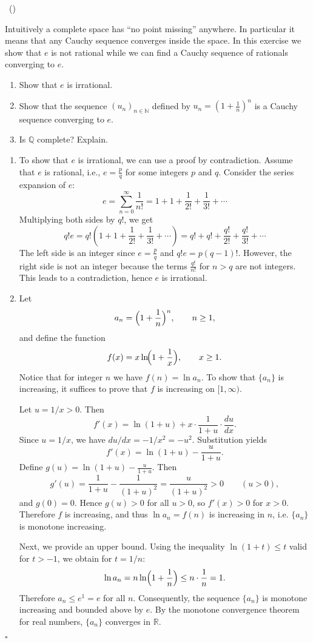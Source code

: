 \documentclass[11pt,a4paper]{article}
\theoremstyle{definition}
\newcounter{problem}
\newenvironment{problem}[1][]{\refstepcounter{problem}\par\medskip
\noindent{\bf Problem~\theproblem.}\ifx\relax#1\relax\else\ (#1)\fi\newline
}{\medskip}
\newenvironment{solution}{\par\noindent{\it Solution.} }{\hfill $\square$ \par}
\begin{document}
\begin{problem}
Intuitively a complete space has “no point missing” anywhere. In particular it means that any Cauchy
sequence converges inside the space. In this exercise we show that $e$ is not rational while we can find a
Cauchy sequence of rationals converging to $e$.
\begin{enumerate}
  \item Show that $e$ is irrational.
  \item Show that the sequence ${(u_n)}_{n \in \mathbb{N}}$ defined by $u_n = {(1 + \frac{1}{n})}^n$ is a Cauchy sequence converging to $e$.
  \item Is $\mathbb{Q}$ complete? Explain.
\end{enumerate}
\begin{solution}
\begin{enumerate}
  \item To show that $e$ is irrational, we can use a proof by contradiction. Assume that $e$ is rational, i.e., $e = \frac{p}{q}$ for some integers $p$ and $q$. Consider the series expansion of $e$:
  \[
  e = \sum_{n=0}^{\infty} \frac{1}{n!} = 1 + 1 + \frac{1}{2!} + \frac{1}{3!} + \cdots
  \]
  Multiplying both sides by $q$!, we get
  \[
  q! e = q! \left(1 + 1 + \frac{1}{2!} + \frac{1}{3!} + \cdots\right) = q! + q! + \frac{q!}{2!} + \frac{q!}{3!} + \cdots
  \]
  The left side is an integer since $e = \frac{p}{q}$ and $q! e = p (q-1)$!. However, the right side is not an integer because the terms $\frac{q!}{n!}$ for $n > q$ are not integers. This leads to a contradiction, hence $e$ is irrational.
  
  \item
Let
\[
a_n=\Bigl(1+\frac{1}{n}\Bigr)^n,\qquad n\ge1,
\]
and define the function
\[
f(x)=x\ln\!\Bigl(1+\frac{1}{x}\Bigr),\qquad x\ge1.
\]
Notice that for integer $n$ we have $f(n)=\ln a_n$.
To show that $\{a_n\}$ is increasing, it suffices to prove that $f$ is increasing on $[1,\infty)$.

Let $u=1/x>0$. Then
\[
f'(x)=\ln(1+u)+x\cdot\frac{1}{1+u}\cdot\frac{du}{dx}.
\]
Since $u=1/x$, we have $du/dx=-1/x^2=-u^2$. Substitution yields
\[
f'(x)=\ln(1+u)-\frac{u}{1+u}.
\]
Define $g(u)=\ln(1+u)-\tfrac{u}{1+u}$. Then
\[
g'(u)=\frac{1}{1+u}-\frac{1}{(1+u)^2}=\frac{u}{(1+u)^2}>0 \qquad (u>0),
\]
and $g(0)=0$. Hence $g(u)>0$ for all $u>0$, so $f'(x)>0$ for $x>0$. Therefore $f$ is increasing, and thus $\ln a_n=f(n)$ is increasing in $n$, i.e. $\{a_n\}$ is monotone increasing.

Next, we provide an upper bound. Using the inequality $\ln(1+t)\le t$ valid for $t>-1$, we obtain for $t=1/n$:
\[
\ln a_n = n\ln\Bigl(1+\frac{1}{n}\Bigr) \le n\cdot\frac{1}{n}=1.
\]
Therefore $a_n\le e^1=e$ for all $n$. Consequently, the sequence $\{a_n\}$ is monotone increasing and bounded above by $e$. By the monotone convergence theorem for real numbers, $\{a_n\}$ converges in $\mathbb{R}$.


\end{enumerate}
\end{solution}
\end{problem}
\end{document}
